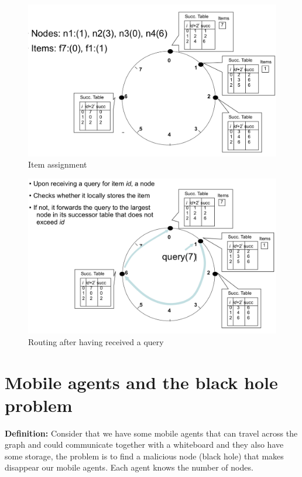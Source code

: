 \documentclass[paper=a4, fontsize=11pt]{scrartcl} %
\numberwithin{equation}{section} %
\numberwithin{figure}{section} %
\numberwithin{table}{section} %
\begin{document}
 \begin{figure}[H]
  \centering
  \includegraphics[width=1\textwidth]{img/chord4.png}
  \caption{Item assignment}
  \label{fig:boat1}
\end{figure}
 \begin{figure}[H]
  \centering
  \includegraphics[width=1\textwidth]{img/chord_query.png}
  \caption{Routing after having received a query}
  \label{fig:boat1}
\end{figure}
\newpage
\section*{Mobile agents and the black hole problem}
\textbf{Definition:} Consider that we have some mobile agents that can travel across the graph and could communicate together with a whiteboard and they also have some storage, the problem is to find a malicious node (black hole) that makes disappear our mobile agents. Each agent knows the number of nodes.\\
\end{document}
